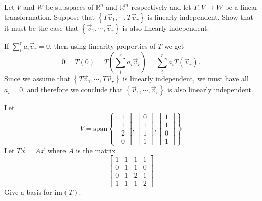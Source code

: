 \documentclass{ximera}
\begin{document}
\begin{problem}\label{prb:10.74} Let $V$ and $W$ be subspaces of $\mathbb{R}^{n}$ and $\mathbb{R}^{m}$
respectively and let $T:V\rightarrow W$ be a linear transformation. Suppose
that $\left\{ T\vec{v}_{1},\cdots ,T\vec{v}_{r}\right\} $ is linearly
independent. Show that it must be the case that $\left\{ \vec{v}_{1},\cdots ,
\vec{v}_{r}\right\} $ is also linearly independent.
\begin{hint}
If $\sum_i^r a_i \vec{v}_r =0$, then using linearity properties of $T$ we get
\[ 0 = T(0) =  T(\sum_i^r a_i \vec{v}_r) =
\sum_i^r a_i T(\vec{v}_r).\]
Since we assume that  $\left\{ T\vec{v}_{1},\cdots ,T\vec{v}_{r}\right\} $ is linearly
independent, we must have all $a_i=0$, and therefore we conclude that
 $\left\{ \vec{v}_{1},\cdots ,
\vec{v}_{r}\right\} $ is also linearly independent.
\end{hint}
\end{problem}


\begin{problem}\label{prb:10.75} Let
\begin{equation*}
V=\mbox{span}\left\{ \left[
\begin{array}{c}
1 \\
1 \\
2 \\
0
\end{array}
\right] ,\left[
\begin{array}{c}
0 \\
1 \\
1 \\
1
\end{array}
\right] ,\left[
\begin{array}{c}
1 \\
1 \\
0 \\
1
\end{array}
\right] \right\}
\end{equation*}
Let $T\vec{x}=A\vec{x}$ where $A$ is the matrix
\begin{equation*}
\left[
\begin{array}{cccc}
1 & 1 & 1 & 1 \\
0 & 1 & 1 & 0 \\
0 & 1 & 2 & 1 \\
1 & 1 & 1 & 2
\end{array}
\right]
\end{equation*}
Give a basis for $\mbox{im}\left( T\right) $.
\end{problem}
\end{document}

